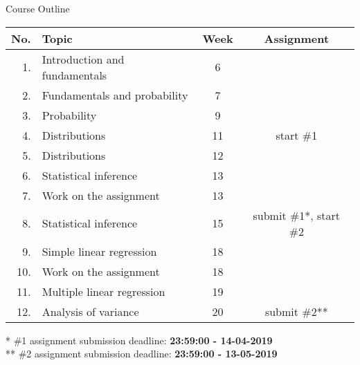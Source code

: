 \begin{frame}{Course Outline}
    \begin{center}
    {\small
    \begin{tabular}{r l c c}
        \hline
        No.	& Topic & Week & Assignment \\
        \hline
        1.    & Introduction and fundamentals & 6 &  \\
        2.    & Fundamentals and probability  & 7 &  \\
        3.    & Probability                   & 9 &  \\
        4.    & Distributions                 & 11 & start \#1 \\
        5.    & Distributions                 & 12 & \\
        6.    & Statistical inference         & 13 & \\
        7.    & Work on the assignment        & 13 & \\
        8.    & Statistical inference         & 15 & submit \#1*, start \#2 \\
        9.    & Simple linear regression      & 18 & \\
        10.   & Work on the assignment        & 18 & \\
        11.   & Multiple linear regression    & 19 & \\
        12.   & Analysis of variance          & 20 & submit \#2** \\
    \end{tabular}
    \vspace{3pt}
    
    * \#1 assignment submission deadline: \textbf{23:59:00 - 14-04-2019}\\
    ** \#2 assignment submission deadline: \textbf{23:59:00 - 13-05-2019}
    }
    \end{center}
\end{frame}